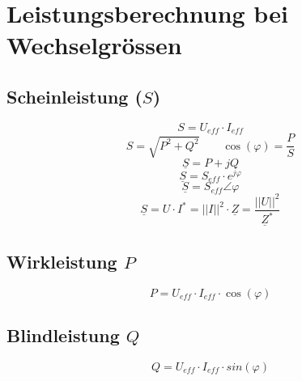 



\section{Leistungsberechnung bei Wechselgrössen}

\subsection{Scheinleistung ($S$)}
\[ S = U_{eff} \cdot I_{eff} \]
\[ S = \sqrt{P^2 + Q^2} \qquad \cos(\varphi) = \frac{P}{S} \]
\[ \underline{S} = P + j Q \]
\[ \underline{S} = S_{eff} \cdot e^{j\varphi} \]
\[ \underline{S} = S_{eff} \angle \varphi \]
\[ \underline{S} = U \cdot I^* = ||I||^2 \cdot \underline{Z} 
= \frac{||U||^2}{\underline{Z}^*} \]

\subsection{Wirkleistung $P$}
\[ P = U_{eff} \cdot I_{eff} \cdot \cos(\varphi) \]

\subsection{Blindleistung $Q$}
\[ Q = U_{eff} \cdot I_{eff} \cdot sin(\varphi) \]
